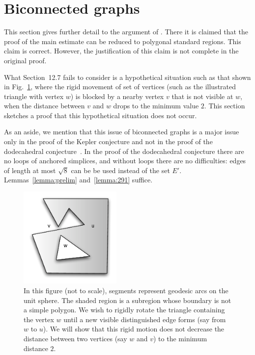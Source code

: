 \documentclass[11pt]{amsart}
\begin{document}
\section{Biconnected graphs}


This section gives further detail to the argument of \cite[Sec.12.7~p.131]{Hales:2006:DCG}.  There it is claimed that
the proof of the main estimate \cite[Theorem~12.1]{Hales:2006:DCG} can be reduced to polygonal standard regions.
This claim is correct. 
However, the justification of this claim is not complete in the original proof. 

What Section~12.7 fails to consider
is a hypothetical situation such as that shown in Fig.~\ref{fig:biconnected}, where the rigid movement of set of vertices (such as the illustrated triangle with vertex $w$)
is blocked by a nearby vertex $v$ that is not visible at $w$, when the distance between $v$ and $w$ drops
to the minimum value $2$.  This section sketches a proof that this hypothetical situation does
not occur.

As an aside, we mention that this issue of biconnected graphs is a major issue only in the 
proof of the Kepler conjecture and not
in the proof of the dodecahedral conjecture~\cite{Hales:2008:Dodec}.  In the proof of the dodecahedral conjecture there are no loops of anchored simplices, and without loops there are no difficulties: edges of length at most
$\sqrt8$ can be be used instead of the set $E'$.  Lemmas~\ref{lemma:prelim} and~\ref{lemma:291} suffice.



\begin{figure}
\begin{center}
\includegraphics[width=5cm]{biconnected}
\end{center}
\caption{In this figure (not to scale), segments represent geodesic arcs on the unit sphere.  The shaded region is a subregion whose boundary is not a simple polygon.
We wish to rigidly rotate the triangle containing the vertex $w$ until a new visible distinguished edge forms
(say from $w$ to $u$).  We will show that this rigid motion does not decrease the distance between
two vertices (say $w$ and $v$)  to the minimum distance $2$.}
\label{fig:biconnected}
\end{figure}
\end{document}
